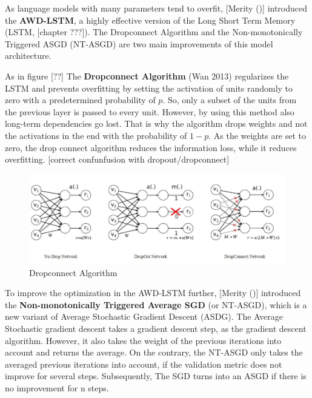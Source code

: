 \documentclass[]{krantz}
\begin{document}
As language models with many parameters tend to overfit, {[}Merity (){]} introduced the \textbf{AWD-LSTM}, a highly effective version of the Long Short Term Memory (LSTM, {[}chapter ???{]}). The Dropconnect Algorithm and the Non-monotonically Triggered ASGD (NT-ASGD) are two main improvements of this model architecture.

As in figure {[}??{]} The \textbf{Dropconnect Algorithm} (Wan 2013) regularizes the LSTM and prevents overfitting by setting the activation of units randomly to zero with a predetermined probability of \(p\). So, only a subset of the units from the previous layer is passed to every unit. However, by using this method also long-term dependencies go lost. That is why the algorithm drops weights and not the activations in the end with the probability of \(1-p\). As the weights are set to zero, the drop connect algorithm reduces the information loss, while it reduces overfitting. {[}correct confunfusion with dropout/dropconnect{]}

\begin{figure}

{\centering \includegraphics[width=0.9\linewidth]{figures/02-01-transfer-learning-for-nlp-1/dropconnect_algorithm} 

}

\caption{Dropconnect Algorithm}\label{fig:ch21-figure02}
\end{figure}

To improve the optimization in the AWD-LSTM further, {[}Merity (){]} introduced the \textbf{Non-monotonically Triggered Average SGD} (or NT-ASGD), which is a new variant of Average Stochastic Gradient Descent (ASDG). The Average Stochastic gradient descent takes a gradient descent step, as the gradient descent algorithm. However, it also takes the weight of the previous iterations into account and returns the average. On the contrary, the NT-ASGD only takes the averaged previous iterations into account, if the validation metric does not improve for several steps. Subsequently, The SGD turns into an ASGD if there is no improvement for n steps.
\end{document}
